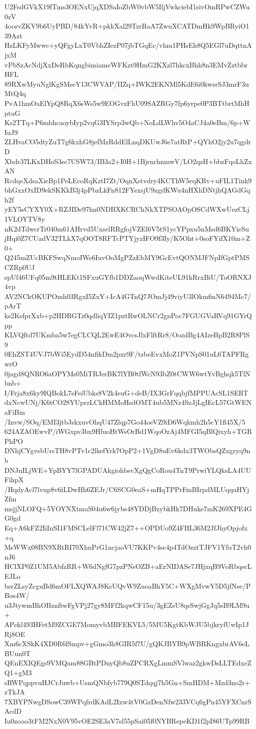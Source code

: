 U2FsdGVkX19fTms3OENxUjqXDSaIoZbW0vbW5IljVwkciebI1sivOmRPwCZWu0zV
4oorvZKV9b6UyPBD/84kYvR+pkkXal29TzrRaA7ZwuXCATDmHk9WpBRyiO139Azt
HzLKFyMwwc+yQFgyLxT0VbhZIezP07jbTGqEc/vhm1PHsEh8Q5EGl7uDqttnAjxM
vPbSzAcNdjXxDeRbKqngbimiameWFKzt9HmG2KXzl7hkcxBhh8n3EMvZztbbrHFL
89RXwMyuNglKgSMseY13CWVAP/IIZq+IWK2EKNMl5KdE6i0kwsrSJ3mrF3uMtQ4q
PvA1hmOaElYpQ8RqX6sWs5w9EOGvzFhU09SAZRGy7fp6yrpe0P3BTtbrtMhHptuG
Ks2TTq+P6mbhcaoybIyp2vqG3IYSrp3wQb+NoLdLWhv5O4aCJ4a0eBm/6p+WIuJ9
ZLHvaCO5dtyZuT7g6kxhG8jefMzRddElLnqDKUwJ6e7atRtP+QYhO2jy2u7qgdrD
Xbdr37LKxDHoS3sc7USW73/IB3a2+I0H+1BjrnrhnmwV/LO2qzH+bbzFqoLhZxAN
RcdqeXdsaXieBp1PeLEcoRqKztI7Zt/OqnXstvdry4KCThW5eqKRv+uFIL1Tink9
bhGxxOxID9ekSKKkB3j4pPbzLkFn812FYsxsjU9ngdKWu4nHXhDNtjhQAGdGqh2f
yEY5sCYXY0X+RZJIDe97hn0NDBXKCRChNkXTPSOAOpOSCdWXwUezCLj1VLOYTV8y
nK2dTdwcrTr040m61AHrvd5UxselRRgfojVZEl6V5tS1ycYPpxu5nMsd6BKYieSu
jHqi0Z7CUadV32TLkX7qOOT8RFTcPTYjyzIFO9f3Iy/K5Oht+0soFYifX10m+Z0+
Q245mZUcBKFSwqNmoIWe6IuvOoMgPZzEbMY9GcEvtQONMJFNpIfGptPMSCZRp0UJ
spUf46UFq05m9tHLEKt1SFxuGYfb1DDZaoqWwdKiteUL91kRrxBiU/ToORNXJ4vp
AV2NCkOKUPOmh03RgxI5ZxY+IcA4GTnQ7JOmJj49viyU3lOkm6nN6494Mc7/pArT
ks2KsfprXxb+p2HDRGTz0qdliqYIZ1pztRwOLNCr2gnPoc7FGUGVaRVq91GYrQpp
KLVQftd7UKmba5w7egCLCQL2EwE4OvcsJlxFlftRr8/OozdBg4AIzeBpB2R8PlS9
0EhZST4UVJ7bWi5EydD54nfikDm2pxr9F/tzbeEvxMoZ1PVNpS01uL6TAPFRgwrO
0jagd8QNRO6aOPYMs0MiTRJerBK7lYB0tfWcN93bZ0tCWW6wtYvBghqk5TlNbnb+
I/Frja8x6ky9IQBokL7sFeiUbks8V2k4euG+deB/IX3GrFqqbjfMPPUAcSL1SERT
dxNcwUNj/K6tCO28YUprzLCkHMMoHsdOMT4ub5MNz4SzJjLgIEcL57GtWENaFiBm
/Invw/SOq/EMI3jtbJskxuvOhqU47Zlqp7Go44oeVZ9iD6Wqkmh2h5cY1fl45X/5
624AZAOEwvP/iWGxpv3bx9HfuoHtWsOrBd1WqoOzAj4MFGI5qBlQixyh+TGRPhPO
DNhjCYgvsbUrsTH8vPTv1c2lkefYrk7OpP2+1VgD8uEv6kdx3TWObsQZxgryq9nb
DNJnILjWE+YpBYY7lGPADUAkgiohbsvXgQgCoRou4TnT9PrwiYLQksLA4UUFihpX
/HqdyAcl7lvup8v6iLDwHh6ZEJr/C6SCG0eaS+mHqTPPrFmBIrpdMLUqquHYjZfm
msjjNLOFQ+5YOYNXtmaS04u6w6jybs48YDDjBzybkHk7DHuke7mK269XPE4GG0gd
Eq+A6kFZ2IiInSI1FMSCLelFl71CW42jZ7++OPDUo9Z4FHL36M2JfJhyOpjofx+q
MsWWx08BN9XRtRI70XhnPrG1ncjaoVU7KKPv4se4p4TdOzztTJFV1YfuT2vh0nJ6
HClXP0Z1UM5AbfzRR+W6dNgfG7pzPNsOZB+aErNIDASe7JHjxqB9VoRbqscLEJLo
bsrZLsyZcguBd6mOFLXQWAJ8KsUQvW9ZuoaBhY5C+WXgMvwY5D5jfNse/PBos4W/
u3JtywmBhOBznftwFgVPj27gy8MFf2kqwCF15u/3gEZsU8qsSwjGgJq5sB9LM9u+
APekl493HFetM9ZCGE7MomyvbMBFEKVL5/5MU5KgtKbWJU5bjkryfUwIp1JRj8OE
Xm6cXSkK4XD0R6lSmpv+gGmo3h8GIR5f7U/gQKJBYB9pWBRKngxbrAV6eLBUun0T
QEnEXIQEgs9VMQam88GBtPDnyQb8uZPCRXgLmmSVlwaz2gkwDsLLTEdxeZQ1+gM3
sRWPqppvuHJCrJuwb+UsmQNbfyb779Q0STdqqj7h5Gn+SmHDM+Mzd3no2r+zTkJA
7XBYPNwgDSowC39WPqfrdKAdL2Ixw4tV0GzDenNfw233VCq6gPn45YFXCnrSAcdD
Iu0zooo3tFM2NxN0V95vOE2SE3aV7sl55pSai05f0NYBRepeKD1f2pI86UTp99RB
